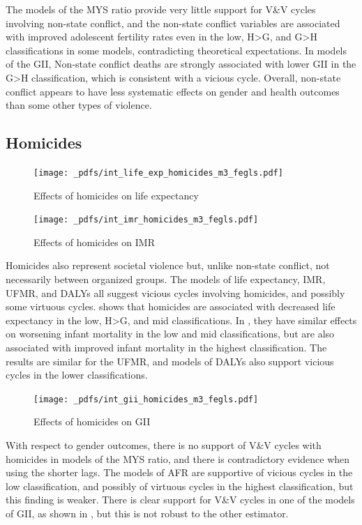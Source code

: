 \documentclass[12pt]{article}
\begin{document}
The models of the MYS ratio provide very little support for V\&V cycles involving non-state conflict, and the non-state conflict variables are associated with improved adolescent fertility rates even in the low, H>G, and G>H classifications in some models, contradicting theoretical expectations. In models of the GII, Non-state conflict deaths are strongly associated with lower GII in the G>H classification, which is consistent with a vicious cycle. Overall, non-state conflict appears to have less systematic effects on gender and health outcomes than some other types of violence.

\subsection{Homicides}

\begin{figure}[!htb]
    \centering
    \caption{Effects of homicides on life expectancy}
    \label{int_life_exp_homicides}
    \texttt{[image: \_pdfs/int\_life\_exp\_homicides\_m3\_fegls.pdf]}
\end{figure}

\begin{figure}[!htb]
    \centering
    \caption{Effects of homicides on IMR}
    \label{int_imr_homicides}
    \texttt{[image: \_pdfs/int\_imr\_homicides\_m3\_fegls.pdf]}
\end{figure}

Homicides also represent societal violence but, unlike non-state conflict, not necessarily between organized groups. The models of life expectancy, IMR, UFMR, and DALYs all suggest vicious cycles involving homicides, and possibly some virtuous cycles.  shows that homicides are associated with decreased life expectancy in the low, H>G, and mid classifications. In , they have similar effects on worsening infant mortality in the low and mid classifications, but are also associated with improved infant mortality in the highest classification. The results are similar for the UFMR, and models of DALYs also support vicious cycles in the lower classifications.

\begin{figure}[!htb]
    \centering
    \caption{Effects of homicides on GII}
    \label{int_gii_homicides}
    \texttt{[image: \_pdfs/int\_gii\_homicides\_m3\_fegls.pdf]}
\end{figure}

With respect to gender outcomes, there is no support of V\&V cycles with homicides in models of the MYS ratio, and there is contradictory evidence when using the shorter lags. The models of AFR are supportive of vicious cycles in the low classification, and possibly of virtuous cycles in the highest classification, but this finding is weaker. There is clear support for V\&V cycles in one of the models of GII, as shown in , but this is not robust to the other estimator.
\end{document}
